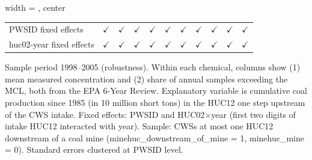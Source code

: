 \begin{table}[htbp]
\begin{adjustbox}{width = \textwidth, center}
\begin{tabular}{lcccccccccc}
          \\
         
         PWSID fixed effects                 & $\checkmark$   & $\checkmark$  & $\checkmark$            & $\checkmark$          & $\checkmark$  & $\checkmark$   & $\checkmark$        & $\checkmark$   & $\checkmark$  & $\checkmark$\\   
         huc02-year fixed effects            & $\checkmark$   & $\checkmark$  & $\checkmark$            & $\checkmark$          & $\checkmark$  & $\checkmark$   & $\checkmark$        & $\checkmark$   & $\checkmark$  & $\checkmark$\\   
         
         \bottomrule
         
      \end{tabular}
      
      
      
   \end{adjustbox}
      {\tiny\linespread{1}\selectfont \par \raggedright 
   Sample period 1998--2005 (robustness). Within each chemical, columns show (1) mean measured concentration and (2) share of annual samples exceeding the MCL, both from the EPA 6-Year Review. Explanatory variable is cumulative coal production since 1985 (in 10 million short tons) in the HUC12 one step upstream of the CWS intake. Fixed effects: PWSID and HUC02$\times$year (first two digits of intake HUC12 interacted with year). Sample: CWSs at most one HUC12 downstream of a coal mine (minehuc\_downstream\_of\_mine = 1, minehuc\_mine = 0). Standard errors clustered at PWSID level.}
   
\end{table}


